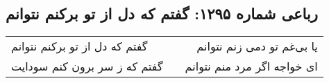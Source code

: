 \begin{center}
\section*{رباعی شماره ۱۲۹۵: گفتم که دل از تو برکنم نتوانم}
\label{sec:1295}
\begin{longtable}{l p{0.5cm} r}
گفتم که دل از تو برکنم نتوانم
&&
یا بی‌غم تو دمی زنم نتوانم
\\
گفتم که ز سر برون کنم سودایت
&&
ای خواجه اگر مرد منم نتوانم
\\
\end{longtable}
\end{center}
